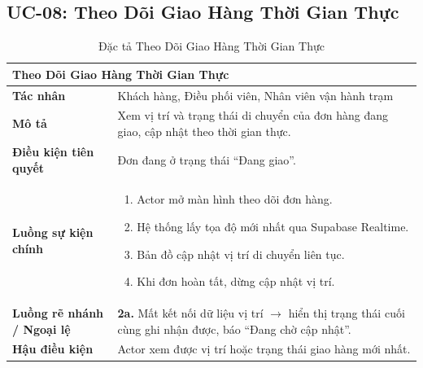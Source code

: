 \subsection{UC-08: Theo Dõi Giao Hàng Thời Gian Thực}
\begin{table}[H]
  \centering
  \begin{tabularx}{\textwidth}{|l|X|}
    \hline
    \multicolumn{2}{|l|}{\textbf{Theo Dõi Giao Hàng Thời Gian Thực}} \\
    \hline
    \textbf{Tác nhân}           & Khách hàng, Điều phối viên, Nhân viên vận hành trạm \\ \hline
    \textbf{Mô tả}              & Xem vị trí và trạng thái di chuyển của đơn hàng đang giao, cập nhật theo thời gian thực. \\ \hline
    \textbf{Điều kiện tiên quyết} & Đơn đang ở trạng thái ``Đang giao''. \\ \hline
    \textbf{Luồng sự kiện chính} &
      \begin{enumerate}[leftmargin=*, nosep, topsep=0pt]
        \item Actor mở màn hình theo dõi đơn hàng.
        \item Hệ thống lấy tọa độ mới nhất qua Supabase Realtime.
        \item Bản đồ cập nhật vị trí di chuyển liên tục.
        \item Khi đơn hoàn tất, dừng cập nhật vị trí.
      \end{enumerate} \\ \hline
    \textbf{Luồng rẽ nhánh / Ngoại lệ} &
      \textbf{2a.} Mất kết nối dữ liệu vị trí $\rightarrow$ hiển thị trạng thái cuối cùng ghi nhận được, báo ``Đang chờ cập nhật''. \\ \hline
    \textbf{Hậu điều kiện}      & Actor xem được vị trí hoặc trạng thái giao hàng mới nhất. \\
    \hline
  \end{tabularx}
  \caption{Đặc tả Theo Dõi Giao Hàng Thời Gian Thực}
  \label{tab:uc08}
\end{table}

